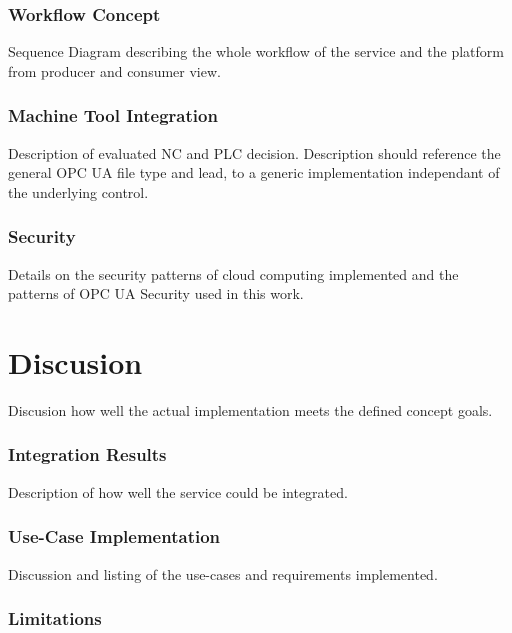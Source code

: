 \documentclass[
a4paper,
twoside,
bibliography=totoc,
headsepline,
cleardoublepage=empty,
parskip=half,
draft=false
]{scrbook}
\begin{document}
			\subsection{Workflow Concept} \label{subsec:workflow_concept}
			
				Sequence Diagram describing the whole workflow of the service and the platform from producer and consumer view.
				
			\subsection{Machine Tool Integration} \label{subsec:machine_tool_intergation}
			
				Description of evaluated NC and PLC decision. Description should reference the general OPC UA file type and lead, to a generic implementation independant of the underlying control.
				
			\subsection{Security} \label{subsec:security}
			
				Details on the security patterns of cloud computing implemented and the patterns of OPC UA Security used in this work.
				
	\chapter{Discusion} \label{ch:discusion}
	
		Discusion how well the actual implementation meets the defined concept goals.
		
		\subsection{Integration Results}\label{subsec:integration_results}
		
			Description of how well the service could be integrated.
			
		\subsection{Use-Case Implementation}\label{subsec:use_cases_implementation}
		
			Discussion and listing of the use-cases and requirements implemented.
			
		\subsection{Limitations}\label{subsec:limitations}
		
\end{document}
